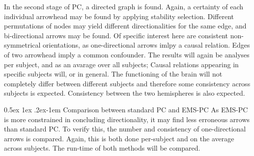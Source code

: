 \documentclass[a4paper, 10pt, english, onecolumn]{article}
\makeatletter
\renewcommand{\paragraph}{%
  \@startsection{paragraph}{4}%
  {\z@}{0.5ex \@plus 1ex \@minus .2ex}{-1em}%
  {\normalfont\normalsize\bfseries}%
}
\makeatother
\begin{document}
In the second stage of PC, a directed graph is found.
Again, a certainty of each individual arrowhead may be found by applying stability selection.
Different permutations of nodes may yield different directionalities for the same edge, and bi-directional arrows may be found.
Of specific interest here are consistent non-symmetrical orientations, as one-directional arrows imlpy a causal relation.
Edges of two arrowhead imply a common confounder.
The results will again be analyses per subject, and as an avarage over all subjects; Causal relations appearing in specific subjects will, or in general.
The functioning of the brain will not completely differ between different subjects and therefore some consistency across subjects is expected.
Consistency between the two hemispheres is also expected.


\paragraph{Comparison between standard PC and EMS-PC}
As EMS-PC is more constrained in concluding directionality, it may find less erroneous arrows than standard PC.
To verify this, the number and consistency of one-directional arrows is compared.
Again, this is both done per-subject and on the average across subjects.
The run-time of both methods will be compared.
\end{document}
